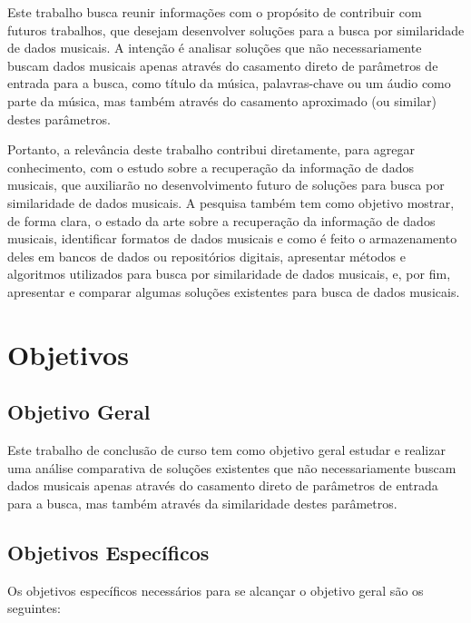 Este trabalho busca reunir informações com o propósito de contribuir com futuros trabalhos, que desejam desenvolver soluções para a busca por similaridade de dados musicais. A intenção é analisar soluções que não necessariamente buscam dados musicais apenas através do casamento direto de parâmetros de entrada para a busca, como título da música, palavras-chave ou um áudio como parte da música, mas também através do casamento aproximado (ou similar) destes parâmetros.

Portanto, a relevância deste trabalho contribui diretamente, para agregar conhecimento, com o estudo sobre a recuperação da informação de dados musicais, que auxiliarão no desenvolvimento futuro de soluções para busca por similaridade de dados musicais. A pesquisa também tem como objetivo mostrar, de forma clara, o estado da arte sobre a recuperação da informação de dados musicais, identificar formatos de dados musicais e como é feito o armazenamento deles em bancos de dados ou repositórios digitais, apresentar métodos e algoritmos utilizados para busca por similaridade de dados musicais, e, por fim, apresentar e comparar algumas soluções existentes para busca de dados musicais.

\section{Objetivos} \label{sec:objetivos}
\subsection{Objetivo Geral} \label{subsec:objetivo-geral}
Este trabalho de conclusão de curso tem como objetivo geral estudar e realizar uma análise comparativa de soluções existentes que não necessariamente buscam dados musicais apenas através do casamento direto de parâmetros de entrada para a busca, mas também através da similaridade destes parâmetros.

\subsection{Objetivos Específicos} \label{subsec:objetivos-especificos}
Os objetivos específicos necessários para se alcançar o objetivo geral são os seguintes:


